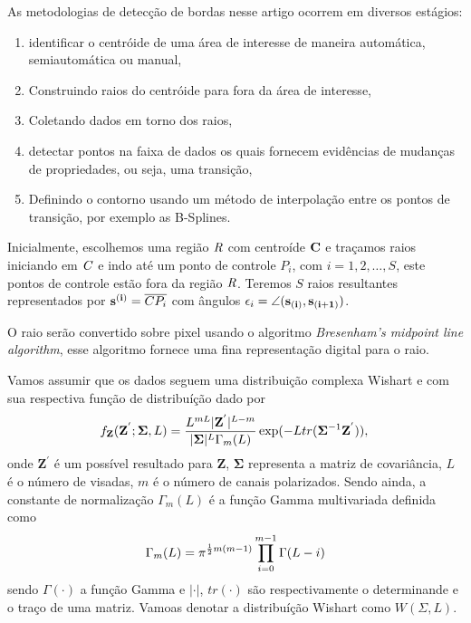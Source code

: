 As metodologias de detecção de bordas nesse artigo ocorrem em diversos estágios:

\begin{enumerate}
	\item identificar o centróide de uma área de interesse de maneira automática, semiautomática ou manual,  
	\item Construindo raios do centróide para fora da área de interesse,
	\item Coletando dados em torno dos raios,
	\item detectar pontos na faixa de dados os quais fornecem evidências de mudanças de propriedades, ou seja, uma transição,
	\item Definindo o contorno usando um método de interpolação entre os pontos de transição, por exemplo as B-Splines.
\end{enumerate}

Inicialmente, escolhemos uma região $\it R$ com centroíde $\bf C$ e traçamos raios iniciando em $\it C$ e indo até um ponto de controle $P_i$, com $i=1,2,\dots, S$, este pontos de controle estão fora da região $\it R$. Teremos $S$ raios resultantes representados por ${\bf s^{(i)}}=\overline{CP_i}$ com ângulos $\epsilon_{i}=\angle ({\bf s_{(i)}},{\bf s_{(i+1)}})$. 

O raio serão convertido sobre pixel usando o algoritmo {\it Bresenham's midpoint line algorithm}, esse algoritmo fornece uma fina representação digital para o raio.

Vamos assumir que os dados seguem uma distribuição complexa Wishart e com sua respectiva função de distribuíção dado por 
\begin{equation}\label{eqn120}
	f_{\mathbf{Z}}(\mathbf{Z^{'}};\mathbf{\Sigma},L)=\frac{L^{mL}|\mathbf{Z^{'}}|^{L-m}}{|\mathbf{\Sigma}|^{L}\Gamma_m(L)} \exp(-L tr(\mathbf{\Sigma}^{-1}\mathbf{Z^{'}})), \\
\end{equation}
onde $\mathbf{Z^{'}}$ é um possível resultado para $\mathbf{Z}$, $\mathbf{\Sigma}$ representa a matriz de covariância, $L$ é o número de visadas, $m$ é o número de canais polarizados.
Sendo ainda, a constante de normalização $\Gamma_m(L)$ é a função Gamma multivariada definida como 
\begin{equation}\label{eqn121}
	\Gamma_m(L)=\pi^{\frac{1}{2}m(m-1)} \prod_{i=0}^{m-1}\Gamma(L-i) \\
\end{equation}
sendo $\Gamma(\cdot)$ a função Gamma e $|\cdot|$, $tr(\cdot)$ são respectivamente o determinande e o traço de uma matriz. Vamoas denotar a distribuíção Wishart como $W(\Sigma,L)$. 


